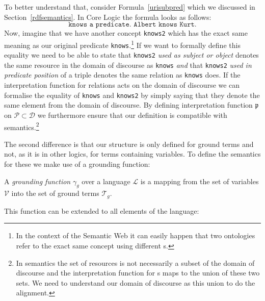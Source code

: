 To better understand that, consider 
Formula~\ref{urisubpred} which we discussed in Section~\ref{rdfsemantics}. In \nthree Core Logic the formula looks as follows:
% 
% 
\[
 \texttt{knows a predicate. Albert knows Kurt.}
\]
Now, imagine that we have another concept \texttt{knows2} which has the exact same meaning as our original predicate \texttt{knows}.\footnote{In the context of the Semantic Web
it can easily happen that two ontologies refer to the exact same concept using different \uri{}s.} If we want to formally define this equality we need to be able to state that
\texttt{knows2} 
\emph{used as subject or object} denotes the same resource in the domain of discourse as  \texttt{knows} \emph{and} that \texttt{knows2} \emph{used in predicate position} 
of a triple denotes the same 
relation as \texttt{knows} does. If the interpretation function for relations acts on the domain of discourse we can formalise the equality of \texttt{knows}  and \texttt{knows2} by 
simply saying that they denote the same element from the domain of discourse. By defining interpretation function $\mathfrak{p}$ on $\mathcal{P}\subset\mathcal{D}$ we furthermore ensure 
that our definition is compatible with \rdf semantics.\footnote{In \rdf semantics the set
of resources is not necessarily a subset of the domain of discourse and the interpretation function for \iri{}s maps to the union of these two sets. 
We need to understand our domain of discourse as this union to do the alignment. 
} 

The second difference is that our structure is only defined for ground terms and not, as it is in other logics, for terms containing variables. 
To define the semantics for these we make use of a grounding function:


\begin{definition}\label{gf}
A \emph{grounding function} $\gamma_g$ over a language $\mathcal{L}$ is a mapping from the set of variables $\mathcal{V}$ %
into the set of ground terms $\mathcal{T}_g$. 
\end{definition}

This function can be extended to all elements of the language:

